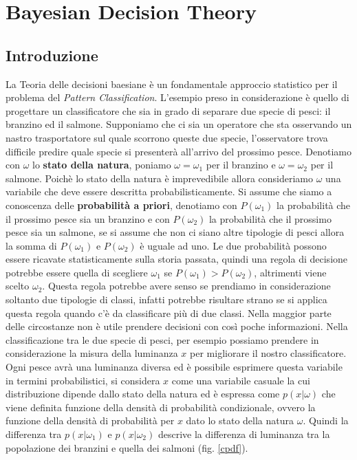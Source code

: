%
%
%

\chapter{Bayesian Decision Theory}\label{teoriaBaesiana}
\label{teoriaBaesiana} %

\section{Introduzione}
La Teoria delle decisioni baesiane è un fondamentale approccio statistico per il problema del \emph{Pattern Classification}. L'esempio preso in considerazione è quello di progettare un classificatore  che sia in grado di separare due specie di pesci: il branzino ed il salmone. Supponiamo che ci sia un operatore che sta osservando un nastro trasportatore sul quale scorrono queste due specie, l'osservatore trova difficile predire quale specie si presenterà all'arrivo del prossimo pesce. Denotiamo con $\omega$ lo \textbf{stato della natura}, poniamo $\omega = \omega_1$ per il branzino e $\omega = \omega_2$ per il salmone. Poichè lo stato della natura è imprevedibile allora consideriamo $\omega$ una variabile che deve essere descritta probabilisticamente. Si assume che siamo a conoscenza delle \textbf{probabilità a priori}, denotiamo con $P(\omega_1)$ la probabilità che il prossimo pesce sia un branzino e con $P(\omega_2)$ la probabilità che il prossimo pesce sia un salmone, se si assume che non ci siano altre tipologie di pesci allora la somma di $P(\omega_1)$ e $P(\omega_2)$ è uguale ad uno. Le due probabilità possono essere ricavate statisticamente sulla storia passata, quindi una regola di decisione potrebbe essere quella di scegliere $\omega_1$ se $P(\omega_1) > P(\omega_2)$, altrimenti viene scelto $\omega_2$. Questa regola potrebbe avere senso se prendiamo in considerazione soltanto due tipologie di classi, infatti potrebbe risultare strano se si applica questa regola quando c'è da classificare più di due classi. Nella maggior parte delle circostanze non è utile prendere decisioni con così poche informazioni. Nella classificazione tra le due specie di pesci, per esempio possiamo prendere in considerazione la misura della luminanza
$x$ per migliorare il nostro classificatore. Ogni pesce avrà una luminanza diversa ed è possibile esprimere questa variabile in termini probabilistici, si considera $x$ come una variabile casuale la cui distribuzione dipende dallo stato della natura ed è espressa come $p(x|\omega)$ che viene definita funzione della densità di probabilità condizionale, ovvero la funzione della densità di probabilità per $x$ dato lo stato della natura $\omega$. Quindi la differenza tra $p(x|\omega_1)$ e  $p(x|\omega_2)$ descrive la differenza di luminanza tra la popolazione dei branzini e quella dei salmoni (fig. \ref{cpdf}).


